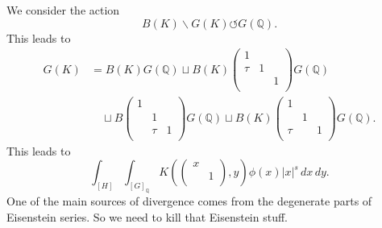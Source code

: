 \documentclass[reqno]{amsart} 
\begin{document}
We consider the action
\begin{equation*}
  B(K) \backslash G(K) \circlearrowleft G(\mathbb{Q}).
\end{equation*}
This leads to
\begin{align*}
  G(K) &= B(K) G(\mathbb{Q}) \sqcup B(K)
         \begin{pmatrix}
    1    &  &  \\
    \tau & 1 &  \\
         &  & 1 \\
  \end{pmatrix}
         G(\mathbb{Q}) \\
       &\quad \sqcup
         B
         \begin{pmatrix}
           1           &  &  \\
                       & 1 &  \\
                       & \tau & 1 \\
         \end{pmatrix}
         G(\mathbb{Q})
         \sqcup
         B(K)
         \begin{pmatrix}
           1           &  &  \\
                       & 1 &  \\
           \tau &  & 1 \\
         \end{pmatrix} G(\mathbb{Q}).
\end{align*}
This leads to
\begin{equation*}
  \int_{[H]} \int_{[G]_{\mathbb{Q}}}
  K \left(
    \begin{pmatrix}
      x      &  \\
             & 1 \\
    \end{pmatrix}
    , y\right) \phi(x) \lvert x \rvert^s \, d x \,d y.
\end{equation*}
One of the main sources of divergence comes from the degenerate parts of Eisenstein series.  So we need to kill that Eisenstein stuff.
\end{document}
